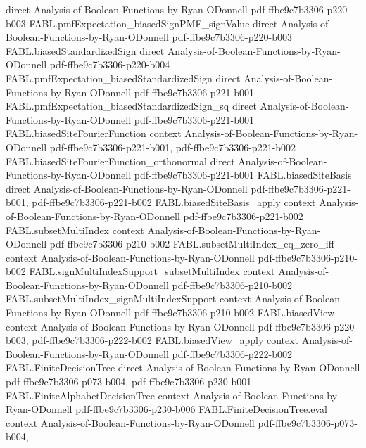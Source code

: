 \begin{theorem}
  {direct}
  {Analysis-of-Boolean-Functions-by-Ryan-ODonnell}
  {pdf-ffbe9c7b3306-p220-b003}
\proofstep
  {FABL.pmfExpectation_biasedSignPMF_signValue}
  {direct}
  {Analysis-of-Boolean-Functions-by-Ryan-ODonnell}
  {pdf-ffbe9c7b3306-p220-b003}
\proofstep
  {FABL.biasedStandardizedSign}
  {direct}
  {Analysis-of-Boolean-Functions-by-Ryan-ODonnell}
  {pdf-ffbe9c7b3306-p220-b004}
\proofstep
  {FABL.pmfExpectation_biasedStandardizedSign}
  {direct}
  {Analysis-of-Boolean-Functions-by-Ryan-ODonnell}
  {pdf-ffbe9c7b3306-p221-b001}
\proofstep
  {FABL.pmfExpectation_biasedStandardizedSign_sq}
  {direct}
  {Analysis-of-Boolean-Functions-by-Ryan-ODonnell}
  {pdf-ffbe9c7b3306-p221-b001}
\proofstep
  {FABL.biasedSiteFourierFunction}
  {context}
  {Analysis-of-Boolean-Functions-by-Ryan-ODonnell}
  {pdf-ffbe9c7b3306-p221-b001,
    pdf-ffbe9c7b3306-p221-b002}
\proofstep
  {FABL.biasedSiteFourierFunction_orthonormal}
  {direct}
  {Analysis-of-Boolean-Functions-by-Ryan-ODonnell}
  {pdf-ffbe9c7b3306-p221-b001}
\proofstep
  {FABL.biasedSiteBasis}
  {direct}
  {Analysis-of-Boolean-Functions-by-Ryan-ODonnell}
  {pdf-ffbe9c7b3306-p221-b001,
    pdf-ffbe9c7b3306-p221-b002}
\proofstep
  {FABL.biasedSiteBasis_apply}
  {context}
  {Analysis-of-Boolean-Functions-by-Ryan-ODonnell}
  {pdf-ffbe9c7b3306-p221-b002}
\proofstep
  {FABL.subsetMultiIndex}
  {context}
  {Analysis-of-Boolean-Functions-by-Ryan-ODonnell}
  {pdf-ffbe9c7b3306-p210-b002}
\proofstep
  {FABL.subsetMultiIndex_eq_zero_iff}
  {context}
  {Analysis-of-Boolean-Functions-by-Ryan-ODonnell}
  {pdf-ffbe9c7b3306-p210-b002}
\proofstep
  {FABL.signMultiIndexSupport_subsetMultiIndex}
  {context}
  {Analysis-of-Boolean-Functions-by-Ryan-ODonnell}
  {pdf-ffbe9c7b3306-p210-b002}
\proofstep
  {FABL.subsetMultiIndex_signMultiIndexSupport}
  {context}
  {Analysis-of-Boolean-Functions-by-Ryan-ODonnell}
  {pdf-ffbe9c7b3306-p210-b002}
\proofstep
  {FABL.biasedView}
  {context}
  {Analysis-of-Boolean-Functions-by-Ryan-ODonnell}
  {pdf-ffbe9c7b3306-p220-b003,
    pdf-ffbe9c7b3306-p222-b002}
\proofstep
  {FABL.biasedView_apply}
  {context}
  {Analysis-of-Boolean-Functions-by-Ryan-ODonnell}
  {pdf-ffbe9c7b3306-p222-b002}
\proofstep
  {FABL.FiniteDecisionTree}
  {direct}
  {Analysis-of-Boolean-Functions-by-Ryan-ODonnell}
  {pdf-ffbe9c7b3306-p073-b004,
    pdf-ffbe9c7b3306-p230-b001}
\proofstep
  {FABL.FiniteAlphabetDecisionTree}
  {context}
  {Analysis-of-Boolean-Functions-by-Ryan-ODonnell}
  {pdf-ffbe9c7b3306-p230-b006}
\proofstep
  {FABL.FiniteDecisionTree.eval}
  {context}
  {Analysis-of-Boolean-Functions-by-Ryan-ODonnell}
  {pdf-ffbe9c7b3306-p073-b004,
}
\end{theorem}
